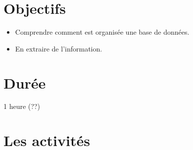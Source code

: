 \documentclass[class=report,crop=false, 12pt]{standalone}
\begin{document}



\section*{Objectifs}

\begin{itemize}
  \item Comprendre comment est organisée une base de données.
  \item En extraire de l'information.
\end{itemize}


\section*{Durée}

1 heure (??)

\section*{Les activités}
\end{document}
